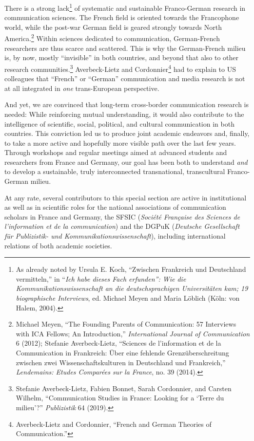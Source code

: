\documentclass{tufte-handout}
\begin{document}
There is a strong lack\footnote{As already noted by Ursula E. Koch,
  ``Zwischen Frankreich und Deutschland vermitteln,'' in ``\emph{Ich
  habe dieses Fach erfunden'': Wie die Kommunikationswissenschaft an die
  deutschsprachigen Universitäten kam; 19 biographische Interviews}, ed.
  Michael Meyen and Maria Löblich (Köln: von Halem, 2004).} of
systematic and sustainable Franco-German research in communication
sciences. The French field is oriented towards the Francophone world,
while the post-war German field is geared strongly towards North
America.\footnote{Michael Meyen, ``The Founding Parents of
  Communication: 57 Interviews with ICA Fellows; An Introduction,''
  \emph{International Journal of Communication} 6 (2012); Stefanie
  Averbeck-Lietz, ``Sciences de l'information et de la Communication in
  Frankreich: Über eine fehlende Grenzüberschreitung zwischen zwei
  Wissenschaftskulturen in Deutschland und Frankreich,''
  \emph{Lendemains: Etudes Comparées sur la France}, no. 39 (2014).}
Within sciences dedicated to communication, German-French researchers
are thus scarce and scattered. This is why the German-French milieu is,
by now, mostly ``invisible'' in both countries, and beyond that also to
other research communities.\footnote{Stefanie Averbeck-Lietz, Fabien
  Bonnet, Sarah Cordonnier, and Carsten Wilhelm, ``Communication Studies
  in France: Looking for a `Terre du milieu'?'' \emph{Publizistik} 64
  (2019).} Averbeck-Lietz and Cordonnier\footnote{Averbeck-Lietz and
  Cordonnier, ``French and German Theories of Communication.''} had to
explain to US colleagues that ``French'' or ``German'' communication and
media research is not at all integrated in \emph{one} trans-European
perspective.

And yet, we are convinced that long-term cross-border communication
research is needed: While reinforcing mutual understanding, it would
also contribute to the intelligence of scientific, social, political,
and cultural communication in both countries. This conviction led us to
produce joint academic endeavors and, finally, to take a more active and
hopefully more visible path over the last few years. Through workshops
and regular meetings aimed at advanced students and researchers from
France and Germany, our goal has been both to understand \emph{and} to
develop a sustainable, truly interconnected transnational, transcultural
Franco-German milieu.

At any rate, several contributors to this special section are active in
institutional as well as in scientific roles for the national
associations of communication scholars in France and Germany, the SFSIC
(\emph{Société Française des Sciences de l'information et de la
communication}) and the DGPuK (\emph{Deutsche Gesellschaft für
Publizistik- und Kommunikationswissenschaft}), including international
relations of both academic societies.
\end{document}
